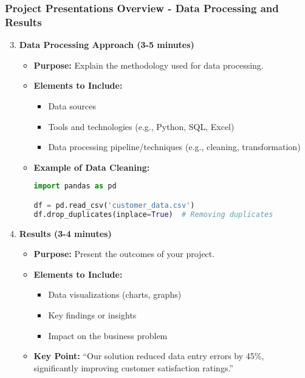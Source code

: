 \documentclass{beamer}
\begin{document}
\begin{frame}[fragile]
    \frametitle{Project Presentations Overview - Data Processing and Results}
    \begin{enumerate}
        \setcounter{enumi}{2}
        \item \textbf{Data Processing Approach (3-5 minutes)}
        \begin{itemize}
            \item \textbf{Purpose:} Explain the methodology used for data processing.
            \item \textbf{Elements to Include:}
            \begin{itemize}
                \item Data sources
                \item Tools and technologies (e.g., Python, SQL, Excel)
                \item Data processing pipeline/techniques (e.g., cleaning, transformation)
            \end{itemize}
            \item \textbf{Example of Data Cleaning:}
            \begin{lstlisting}[language=Python]
import pandas as pd

df = pd.read_csv('customer_data.csv')
df.drop_duplicates(inplace=True)  # Removing duplicates
            \end{lstlisting}
        \end{itemize}

        \item \textbf{Results (3-4 minutes)}
        \begin{itemize}
            \item \textbf{Purpose:} Present the outcomes of your project.
            \item \textbf{Elements to Include:}
            \begin{itemize}
                \item Data visualizations (charts, graphs)
                \item Key findings or insights
                \item Impact on the business problem
            \end{itemize}
            \item \textbf{Key Point:} ``Our solution reduced data entry errors by 45\%, significantly improving customer satisfaction ratings.”
        \end{itemize}
    \end{enumerate}
\end{frame}
\end{document}
